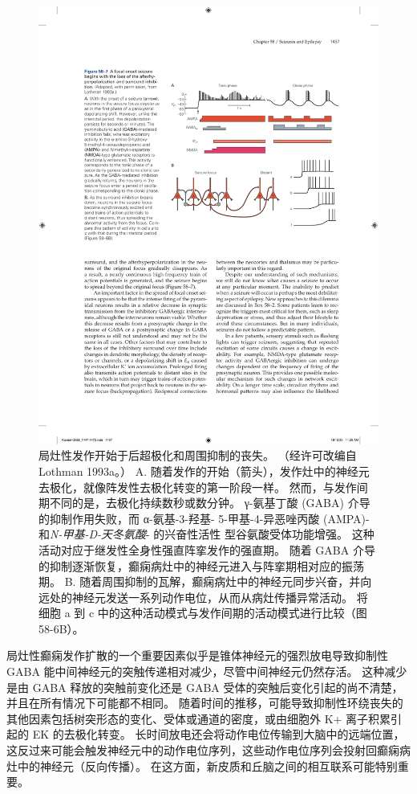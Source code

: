 \begin{figure}[htbp]
	\centering
	\includegraphics[width=0.7\linewidth]{chap58/fig_58_7}
	\caption{局灶性发作开始于后超极化和周围抑制的丧失。 （经许可改编自 Lothman 1993a。） A. 随着发作的开始（箭头），发作灶中的神经元去极化，就像阵发性去极化转变的第一阶段一样。 然而，与发作间期不同的是，去极化持续数秒或数分钟。 γ-氨基丁酸 (GABA) 介导的抑制作用失败，而 α-氨基-3-羟基- 5-甲基-4-异恶唑丙酸 (AMPA)- 和\textit{N-甲基-D-天冬氨酸}- 的兴奋性活性 型谷氨酸受体功能增强。 这种活动对应于继发性全身性强直阵挛发作的强直期。 随着 GABA 介导的抑制逐渐恢复，癫痫病灶中的神经元进入与阵挛期相对应的振荡期。 B. 随着周围抑制的瓦解，癫痫病灶中的神经元同步兴奋，并向远处的神经元发送一系列动作电位，从而从病灶传播异常活动。 将细胞 a 到 c 中的这种活动模式与发作间期的活动模式进行比较（图 58-6B）。}
	\label{fig:58_7}
\end{figure}


局灶性癫痫发作扩散的一个重要因素似乎是锥体神经元的强烈放电导致抑制性 GABA 能中间神经元的突触传递相对减少，尽管中间神经元仍然存活。
这种减少是由 GABA 释放的突触前变化还是 GABA 受体的突触后变化引起的尚不清楚，并且在所有情况下可能都不相同。
随着时间的推移，可能导致抑制性环绕丧失的其他因素包括树突形态的变化、受体或通道的密度，或由细胞外 K+ 离子积累引起的 EK 的去极化转变。
长时间放电还会将动作电位传输到大脑中的远端位置，这反过来可能会触发神经元中的动作电位序列，这些动作电位序列会投射回癫痫病灶中的神经元（反向传播）。
在这方面，新皮质和丘脑之间的相互联系可能特别重要。


